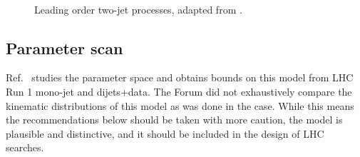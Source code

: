 \begin{figure}
\begin{feynmandiagram}[modelTDijetD]
  \end{feynmandiagram}\\\vspace{3\baselineskip}
  \begin{feynmandiagram}[modelTDijetE]
  \end{feynmandiagram}
\caption{Leading order two-jet \tchannel processes, adapted from \cite{Papucci:2014iwa}.}\label{fig:tchannelDijet}
\end{figure}

\subsection{Parameter scan}

Ref.~\cite{Papucci:2014iwa} studies the parameter space and obtains
bounds on this model from LHC Run 1 mono-jet and dijets+\MET data. The Forum did not exhaustively compare the kinematic distributions of this model as was done in the \schannel case. While this means the recommendations below should be taken with more caution, the model is plausible and distinctive, and it should be included in the design of LHC searches.

